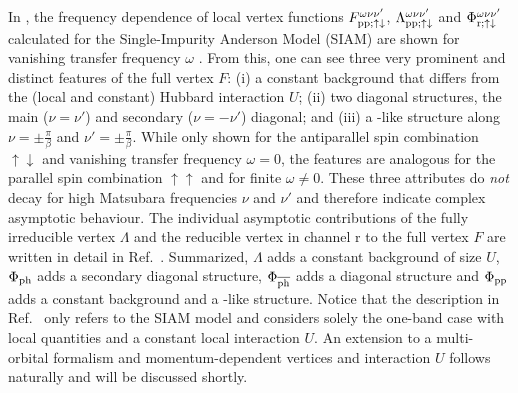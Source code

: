\documentclass[../../main.tex]{subfiles}
\begin{document}
In , the frequency dependence of local vertex functions $F^{\omega\nu\nu'}_{\text{pp};\uparrow\downarrow}$, $\Lambda^{\omega\nu\nu'}_{\text{pp};\uparrow\downarrow}$ and $\Phi^{\omega\nu\nu'}_{\text{r};\uparrow\downarrow}$ calculated for the Single-Impurity Anderson Model (SIAM) are shown for vanishing transfer frequency $\omega$ \cite{Wentzell2020}. From this, one can see three very prominent and distinct features of the full vertex $F$: (i) a constant background that differs from the (local and constant) Hubbard interaction $U$; (ii) two diagonal structures, the main ($\nu=\nu'$) and secondary ($\nu=-\nu'$) diagonal; and (iii) a -like structure along $\nu=\pm\frac\pi\beta$ and $\nu'=\pm\frac\pi\beta$. While only shown for the antiparallel spin combination $\uparrow\downarrow$ and vanishing transfer frequency $\omega=0$, the features are analogous for the parallel spin combination $\uparrow\uparrow$ and for finite $\omega\neq0$. These three attributes do \textit{not} decay for high Matsubara frequencies $\nu$ and $\nu'$ and therefore indicate complex asymptotic behaviour. The individual asymptotic contributions of the fully irreducible vertex $\Lambda$ and the reducible vertex in channel r to the full vertex $F$ are written in detail in Ref.~\cite{Wentzell2020}. Summarized, $\Lambda$ adds a constant background of size $U$, $\Phi_{\text{ph}}$ adds a secondary diagonal structure, $\Phi_{\overline{\text{ph}}}$ adds a diagonal structure and $\Phi_{\text{pp}}$ adds a constant background and a -like structure. Notice that the description in Ref.~\cite{Wentzell2020} only refers to the SIAM model and considers solely the one-band case with local quantities and a constant local interaction $U$. An extension to a multi-orbital formalism and momentum-dependent vertices and interaction $U$ follows naturally and will be discussed shortly.
\end{document}
